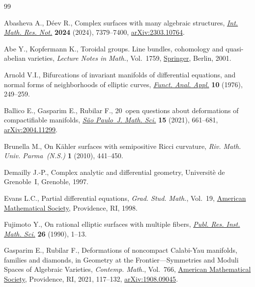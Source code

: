 \documentclass[10pt,a4paper]{amsart}
\numberwithin{equation}{section}
\begin{document}
\begin{thebibliography}{99}
\footnotesize\itemsep=0pt

Abasheva A., D\'eev R., Complex surfaces with many algebraic structures,
 \href{https://doi.org/10.1093/imrn/rnad190}{\textit{Int. Math. Res. Not.}}
 \textbf{2024} (2024), 7379--7400,
 \href{http://arxiv.org/abs/2303.10764}{arXiv:2303.10764}.

Abe Y., Kopfermann K., Toroidal groups. Line bundles, cohomology and
 quasi-abelian varieties, \textit{Lecture Notes in Math.}, Vol.~1759,
 \href{https://doi.org/10.1007/b80605}{Springer}, Berlin, 2001.

Arnold V.I., Bifurcations of invariant manifolds of differential equations, and
 normal forms of neighborhoods of elliptic curves,
 \href{https://doi.org/10.1007/BF01076024}{\textit{Funct. Anal. Appl.}}
 \textbf{10} (1976), 249--259.

Ballico E., Gasparim E., Rubilar F., 20~open questions about deformations of
 compactifiable manifolds,
 \href{https://doi.org/10.1007/s40863-021-00213-8}{\textit{S\~{a}o Paulo~J.
 Math. Sci.}} \textbf{15} (2021), 661--681,
 \href{http://arxiv.org/abs/2004.11299}{arXiv:2004.11299}.

Brunella M., On {K}\"ahler surfaces with semipositive {R}icci curvature,
 \textit{Riv. Math. Univ. Parma~(N.S.)} \textbf{1} (2010), 441--450.

Demailly J.-P., Complex analytic and differential geometry, Universit\`e de
 Grenoble~I, Grenoble, 1997.

Evans L.C., Partial differential equations, \textit{Grad. Stud. Math.},
 Vol.~19, \href{https://doi.org/10.1090/gsm/019}{American Mathematical
 Society}, Providence, RI, 1998.

Fujimoto Y., On rational elliptic surfaces with multiple fibers,
 \href{https://doi.org/10.2977/prims/1195171661}{\textit{Publ. Res. Inst.
 Math. Sci.}} \textbf{26} (1990), 1--13.

Gasparim E., Rubilar F., Deformations of noncompact {C}alabi-{Y}au manifolds,
 families and diamonds, in Geometry at the {F}rontier---{S}ymmetries and
 {M}oduli {S}paces of {A}lgebraic {V}arieties, \textit{Contemp. Math.}, Vol.~766, \href{https://doi.org/10.1090/conm/766/15378}{American Mathematical
 Society}, Providence, RI, 2021, 117--132,
 \href{http://arxiv.org/abs/1908.09045}{arXiv:1908.09045}.


\end{thebibliography}
\end{document}
